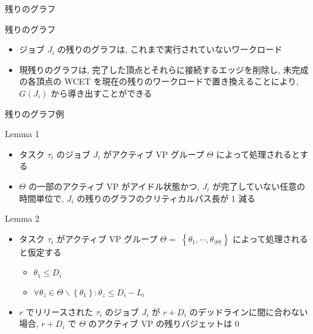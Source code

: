 \begin{frame}{残りのグラフ}
    \begin{block}{残りのグラフ}
       \setlength{\linewidth}{0.98\columnwidth}
        \begin{itemize}
            \item ジョブ $J_{i}$ の残りのグラフは, これまで実行されていないワークロード
            \item 現残りのグラフは, 完了した頂点とそれらに接続するエッジを削除し, 未完成の各頂点の WCET を現在の残りのワークロードで置き換えることにより, $G\left(J_{i}\right)$ から導き出すことができる
        \end{itemize}
    \end{block}
\end{frame}

\begin{frame}{残りのグラフ例}
\end{frame}

\begin{frame}[label=lemma1]{Lemma 1}
    \begin{lemma}[]
        \begin{itemize}
            \item タスク $\tau_{i}$ のジョブ $J_{i}$ がアクティブ VP グループ $\Theta$ によって処理されるとする
            \item $\Theta$ の一部のアクティブ VP がアイドル状態かつ, $J_{i}$ が完了していない任意の時間単位で,  $J_{i}$ の残りのグラフのクリティカルパス長が 1 減る
        \end{itemize}
    \end{lemma}
\end{frame}

\begin{frame}[label=lemma2]{Lemma 2}
    \begin{lemma}[]
        \begin{itemize}
            \item タスク $\tau_{i}$ がアクティブ VP グループ $\Theta=$  $\left\{\theta_{1}, \cdots, \theta_{|\Theta|}\right\}$ によって処理されると仮定する
            \begin{itemize}
                \item $\theta_{1} \leq D_{i}$
                \item $\forall \theta_{z} \in \Theta \backslash\left\{\theta_{1}\right\}: \theta_{z} \leq D_{i}-L_{i}$
            \end{itemize}
            \item $r$ でリリースされた $\tau_{i}$ のジョブ $J_{i}$ が $r+D_{i}$ のデッドラインに間に合わない場合, $r+D_{i}$ で $\Theta$ のアクティブ VP の残りバジェットは 0
        \end{itemize}
    \end{lemma}
\end{frame}

